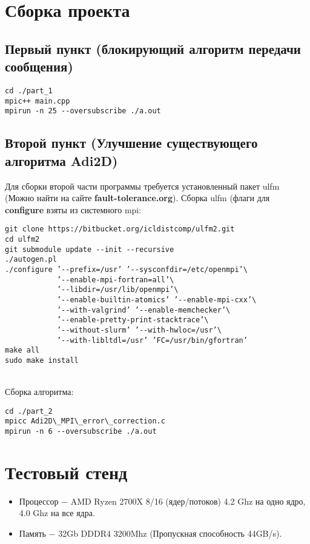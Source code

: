 \documentclass[a4peper, 12pt, titlepage, finall]{extreport}
\begin{document}
        \section{Сборка проекта}
            \subsection{Первый пункт (блокирующий алгоритм передачи сообщения)}
\begin{lstlisting}
cd ./part_1
mpic++ main.cpp
mpirun -n 25 --oversubscribe ./a.out
\end{lstlisting}
            \subsection{Второй пункт (Улучшение существующего алгоритма Adi2D)}
                Для сборки второй части программы требуется установленный пакет ulfm (Можно найти на сайте \textbf{fault-tolerance.org}).
    Сборка ulfm (флаги для \textbf{configure} взяты из системного mpi:\\
\begin{lstlisting}
git clone https://bitbucket.org/icldistcomp/ulfm2.git
cd ulfm2
git submodule update --init --recursive
./autogen.pl
./configure ’--prefix=/usr’ ’--sysconfdir=/etc/openmpi’\
            ’--enable-mpi-fortran=all’\
            ’--libdir=/usr/lib/openmpi’\
            ’--enable-builtin-atomics’ ’--enable-mpi-cxx’\
            ’--with-valgrind’ ’--enable-memchecker’\
            ’--enable-pretty-print-stacktrace’\
            ’--without-slurm’ ’--with-hwloc=/usr’\
            ’--with-libltdl=/usr’ ’FC=/usr/bin/gfortran’
make all
sudo make install
\end{lstlisting}
~\\
            Сборка алгоритма: 
~\\
\begin{lstlisting}
cd ./part_2
mpicc Adi2D\_MPI\_error\_correction.c
mpirun -n 6 --oversubscribe ./a.out
\end{lstlisting}
    \section{Тестовый стенд}
        \begin{itemize}
            \item Процессор $-$ AMD Ryzen 2700X 8/16 (ядер/потоков) 4.2 Ghz на одно ядро, 4.0 Ghz на все ядра.
            \item Память $-$ 32Gb DDDR4 3200Mhz (Пропускная способность 44GB/s).
        \end{itemize}
\end{document}
